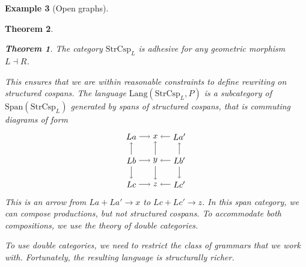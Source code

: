 \documentclass{amsart}
\newcommand{\Span}{\cat{Span}}
\newcommand{\StrCsp}{\cat{StrCsp}}
\newcommand{\Lang}{\mathrm{Lang}}
\newcommand{\Span}{\cat{Span}}
\newcommand{\cat}[1]{\mathrm{#1}}
\newcommand{\csp}[3]{#1 + #3 \to #2}
\newtheorem{theorem}{Theorem}[section]
\theoremstyle{remark}
\theoremstyle{definition}
\newtheorem{example}[theorem]{Example}
\begin{document}
\begin{example}[Open graphs]
{{\begin{theorem}
\begin{theorem} \label{thm:dpo_category-StrCsp-adhsv}
  The category $ \StrCsp_{L} $ is adhesive for any geometric morphism
  $ L \dashv R $.
\end{theorem}

This ensures that we are within reasonable
constraints to define rewriting on structured cospans. The language
$ \Lang ( \StrCsp_{L} , P ) $ is a subcategory of
$ \Span ( \StrCsp_{L} ) $ generated by spans of structured cospans,
that is commuting diagrams of form
%
\[
  \begin{tikzpicture}
    \node (1) at (0,2) {\( La \)};
    \node (2) at (1,2) {\( x \)};
    \node (3) at (2,2) {\( La' \)};
    \node (4) at (0,1) {\( Lb \)};
    \node (5) at (1,1) {\( y \)};
    \node (6) at (2,1) {\( Lb' \)};
    \node (7) at (0,0) {\( Lc \)};
    \node (8) at (1,0) {\( z \)};
    \node (9) at (2,0) {\( Lc' \)};
    \draw [->] (1) to node [] {\scriptsize{\(  \)}} (2);
    \draw [->] (3) to node [] {\scriptsize{\(  \)}} (2);
    \draw [->] (4) to node [] {\scriptsize{\(  \)}} (5);
    \draw [->] (6) to node [] {\scriptsize{\(  \)}} (5);
    \draw [->] (7) to node [] {\scriptsize{\(  \)}} (8);
    \draw [->] (9) to node [] {\scriptsize{\(  \)}} (8);
    \draw [->] (4) to node [] {\scriptsize{\(  \)}} (1);
    \draw [->] (4) to node [] {\scriptsize{\(  \)}} (7);
    \draw [->] (5) to node [] {\scriptsize{\(  \)}} (2);
    \draw [->] (5) to node [] {\scriptsize{\(  \)}} (8);
    \draw [->] (6) to node [] {\scriptsize{\(  \)}} (3);
    \draw [->] (6) to node [] {\scriptsize{\(  \)}} (9); 
  \end{tikzpicture}
\]
% 
This is an arrow from $ \csp{La}{x}{La'}$ to $ \csp{Lc}{z}{Lc'} $. In
this span category, we can compose productions, but not structured
cospans.  To accommodate both compositions, we use the theory of
double categories.

To use double categories, we need to restrict the class of grammars
that we work with.  Fortunately, the resulting language is
structurally richer. 


\end{theorem}}}
\end{example}
\end{document}
